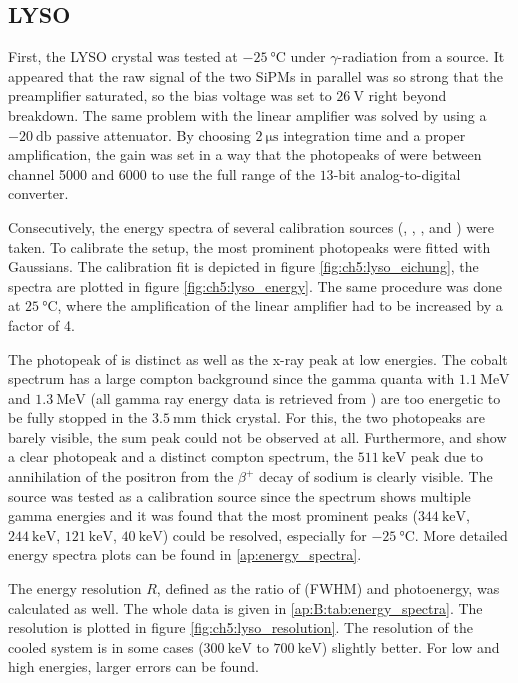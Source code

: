 \subsection{LYSO}
First, the LYSO crystal was tested at $\SI{-25}{\degreeCelsius}$ under $\gamma$-radiation from a \co{} source. It appeared that the raw signal of the two SiPMs in parallel was so strong that the preamplifier saturated, so the bias voltage was set to $\SI{26}{\volt}$ right beyond breakdown. The same problem with the linear amplifier was solved by using a $\SI{-20}{\decibel}$ passive attenuator. By choosing $\SI{2}{\micro\second}$ integration time and a proper amplification, the gain was set in a way that the photopeaks of \co{} were between channel 5000 and 6000 to use the full range of the $13$-bit analog-to-digital converter.  \par  
Consecutively, the energy spectra of several calibration sources (\co{}, \na{}, \cs{}, \ba{} and \eu{}) were taken. To calibrate the setup, the most prominent photopeaks were fitted with Gaussians. The calibration fit is depicted in figure \ref{fig:ch5:lyso_eichung}, the spectra are plotted in figure \ref{fig:ch5:lyso_energy}. The same procedure was done at $\SI{25}{\degreeCelsius}$, where the amplification of the linear amplifier had to be increased by a factor of 4. \par 
The photopeak of \ba{} is distinct as well as the x-ray peak at low energies. The cobalt spectrum has a large compton background since the gamma quanta with $\SI{1.1}{\MeV}$ and $\SI{1.3}{\MeV}$ (all gamma ray energy data is retrieved from \cite{gamma_energy}) are too energetic to be fully stopped in the $\SI{3.5}{\milli\meter}$ thick crystal. For this, the two photopeaks are barely visible, the sum peak could not be observed at all. Furthermore, \cs{} and \na{} show a clear photopeak and a distinct compton spectrum, the $\SI{511}{\keV}$ peak due to annihilation of the positron from the $\beta^+$ decay of sodium is clearly visible. The \eu{} source was tested as a calibration source since the spectrum shows multiple gamma energies and it was found that the most prominent peaks ($\SI{344}{\keV}$, $\SI{244}{\keV}$, $\SI{121}{\keV}$, $\SI{40}{\keV}$) could be resolved, especially for $\SI{-25}{\degreeCelsius}$. More detailed energy spectra plots can be found in \ref{ap:energy_spectra}.  \par 
The energy resolution $R$, defined as the ratio of  (FWHM) and photoenergy, was calculated as well. The whole data is given in \ref{ap:B:tab:energy_spectra}. The resolution is plotted in figure \ref{fig:ch5:lyso_resolution}. The resolution of the cooled system is in some cases ($\SI{300}{\keV}$ to $\SI{700}{\keV}$) slightly better. For low and high energies, larger errors can be found. 
